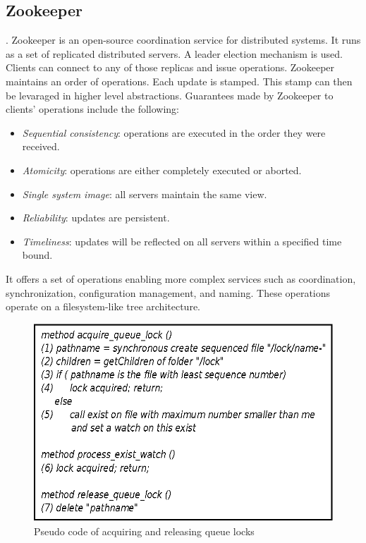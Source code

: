 \subsection{Zookeeper}
. Zookeeper is an open-source coordination service for distributed systems. It runs as a set of replicated distributed servers. A leader election mechanism is used. Clients can connect to any of those replicas and issue operations. Zookeeper maintains an order of operations. Each update is stamped. This stamp can then be levaraged in higher level abstractions. Guarantees made by Zookeeper to clients' operations include the following:
\begin{itemize}
\item{\emph{Sequential consistency}: operations are executed in the order they were received. }
\item{\emph{Atomicity}: operations are either completely executed or aborted. }
\item{\emph{Single system image}: all servers maintain the same view. }
\item{\emph{Reliability}: updates are persistent. }
\item{\emph{Timeliness}: updates will be reflected on all servers within a specified time bound. }
\end{itemize}

It offers a set of operations enabling more complex services such as coordination, synchronization, configuration management, and naming. These operations operate on a filesystem-like tree architecture. 

\begin{figure}[h]
\centering
\includegraphics[scale=0.85]{img/queue_lock_pseudo.eps}
\caption{Pseudo code of acquiring and releasing queue locks}
\label{fig:queue_lock_pseudo}
\end{figure}

